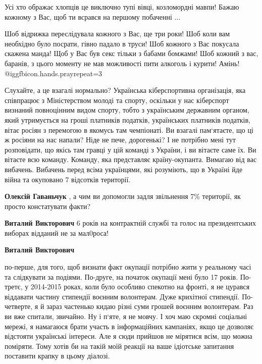 \begin{itemize}
\begin{itemize}
Усі хто ображає хлопців це виключно тупі вівці, козломордні мавпи! Бажаю
кожному з Вас, щоб ти всрався на першому побаченні ...

Шоб відрижка переслідувала кожного з Вас, ще три роки! Шоб коли вам необхідно
було посрати, гівно падало в труси! Шоб кожного з Вас покусала скажена манда!
Щоб у Вас був секс тільки з бабами бомжами! Шоб кожний з вас, баранів, з цього
моменту не мав можливості пити алкоголь і курити! Амінь!  @igg{fbicon.hands.pray}{repeat=3} 

\end{itemize} %


Слухайте, а це взагалі нормально? Українська кіберспортивна організація, яка
співпрацює з Міністерством молоді та спорту, оскільки у нас кіберспорт визнаний
повноцінним видом спорту, тобто з українським державним органом, який
утримується на гроші платників податків, українських платників податків, вітає
росіян з перемогою в якомусь там чемпіонаті. Ви взагалі пам‘ятаєте, що ці ж
росіяни на нас напали? Ніде не пече, дорогенькі? І не потрібно мені тут
розповідати, що якісь там гравці у цій команді з України, і ви вітаєте саме їх.
Ви вітаєте всю команду. Команду, яка представляє країну-окупанта. Вимагаю від
вас вибачень. Вибачень перед всіма українцями, які розуміють, що в Україні йде
війна та окуповано 7 відсотків території.

\begin{itemize} %
\textbf{Олексій Гаваньчук} , а чим ви допомогли задля звільнення 7\% території, як просто констатувати факти?

\begin{itemize} %
\textbf{Виталий Викторович} 6 років на контрактній службі та голос на президентських виборах відданий не за мал0роса!

\textbf{Виталий Викторович} 

по-перше, для того, щоб визнати факт окупації потрібно жити у реальному часі та
слідкувати за подіями. По-друге, на початок окупації мені було 17 років.
По-третє, у 2014-2015 роках, коли було особливо спекотно на фронті, я не
цурався віддавати частину стипендії воєнним волонтерам. Дуже крихітної
стипендії. По-четверте, я й зараз частенько кидаю різні суми грошей воєнним
волонтерам. Раз ви вже спитали, звичайно. Ну і п‘яте, я не мовчу. І хоч маю
скромні соціальні мережі, я намагаюся брати участь в інформаційних кампаніях,
якщо це дозволяє відстояти українські інтереси. Але я сюди прийшов не мірятися
всім, що можна поміряти. Тому хотів би на такій моїй реакції на ваше ідіотське
запитання поставити крапку в цьому діалозі.


\end{itemize}
\end{itemize}
\end{itemize}
